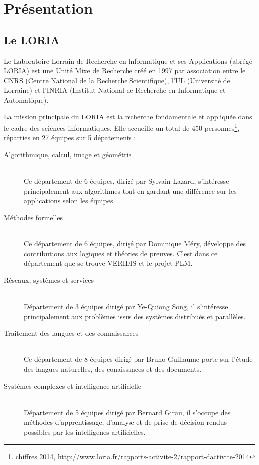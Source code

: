 \documentclass[stage]{tnreport}
\begin{document}
\chapter{Présentation}

\section{Le LORIA}

Le Laboratoire Lorrain de Recherche en Informatique et ses Applications (abrégé LORIA\cite{LR-WS}) est une Unité Mixe de Recherche créé en 1997 par association entre le CNRS (Centre National de la Recherche Scientifique), l'UL (Université de Lorraine) et l'INRIA (Institut National de Recherche en Informatique et Automatique).

La mission principale du LORIA est la recherche fondamentale et appliquée dans le cadre des sciences informatiques. Elle accueille un total de 450 personnes\footnote{chiffres 2014, http://www.loria.fr/rapports-activite-2/rapport-dactivite-2014}, réparties en 27 équipes sur 5 dépatements :
\begin{description}
	\item[Algorithmique, calcul, image et géométrie] \hfill \\
		Ce département de 6 équipes, dirigé par Sylvain Lazard, s'intéresse principalement aux algorithmes tout en gardant une différence sur les applications selon les équipes.
	\item[Méthodes formelles] \hfill \\
		 Ce département de 6 équipes, dirigé par Dominique Méry, développe des contributions aux logiques et théories de preuves. C'est dans ce département que se trouve VERIDIS et le projet PLM.
	\item[Réseaux, systèmes et services] \hfill \\
		 Département de 3 équipes dirigé par Ye-Quiong Song, il s'intéresse principalement aux problèmes issus des systèmes distribués et parallèles.
	\item[Traitement des langues et des connaissances] \hfill \\
		 Ce département de 8 équipes dirigé par Bruno Guillaume porte sur l'étude des langues naturelles, des conaissances et des documents.
	\item[Systèmes complexes et intelligence artificielle] \hfill \\
		 Département de 5 équipes dirigé par Bernard Girau, il s'occupe des méthodes d'apprentissage, d'analyse et de prise de décision rendus possibles par les intelligenes artificielles.
\end{description}
\end{document}
